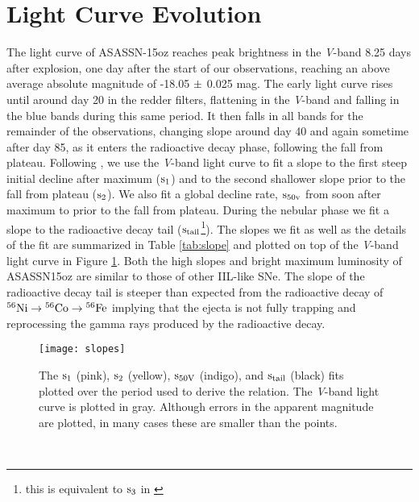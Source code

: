 \documentclass[a4paper,fleqn,usenatbib]{mnras}
\begin{document}
\section{Light Curve Evolution} \label{sec:LCEvolve}
The light curve of ASASSN-15oz reaches peak brightness in the {\it V}-band 8.25 days after explosion, one day after the start of our observations, reaching an above average absolute magnitude of -18.05 $\rm{\pm}$ 0.025 mag.
The early light curve rises until around day 20 in the redder filters, flattening in the {\it V}-band and falling in the blue bands during this same period. 
It then falls in all bands for the remainder of the observations, changing slope around day 40 and again sometime after day 85, as it enters the radioactive decay phase, following the fall from plateau. 
Following \citet{2014anderson}, we use the {\it V}-band light curve to fit a slope to the first steep initial decline after maximum ($\rm{s_1}$) and to the second shallower slope prior to the fall from plateau ($\rm{s_2}$). 
We also fit a global decline rate, $\rm{s_{50v}}$ from soon after maximum to prior to the fall from plateau.
During the nebular phase we fit a slope to the radioactive decay tail ($\rm{s_{tail}}$\footnote{this is equivalent to $\rm{s_{3}}$ in \citet{2014anderson}}). 
The slopes we fit as well as the details of the fit are summarized in Table \ref{tab:slope} and plotted on top of the {\it V}-band light curve in Figure \ref{fig:slopes}.
Both the high slopes and bright maximum luminosity of ASASSN15oz are similar to those of other IIL-like SNe. 
The slope of the radioactive decay tail is steeper than expected from the radioactive decay of $\rm{{}^{56}Ni \rightarrow {}^{56}Co \rightarrow {}^{56}Fe}$ implying that the ejecta is not fully trapping and reprocessing the gamma rays produced by the radioactive decay.
\begin{figure}
\begin{center}
\texttt{[image: slopes]} %
\caption{The $\rm{s_{1}}$ (pink), $\rm{s_{2}}$ (yellow), $\rm{s_{50V}}$ (indigo), and $\rm{ s_{tail}}$ (black) fits plotted over the period used to derive the relation. 
The {\it V}-band light curve is plotted in gray. 
Although errors in the apparent magnitude are plotted, in many cases these are smaller than the points.}
\label{fig:slopes}
\end{center}
\end{figure}\\
\end{document}
